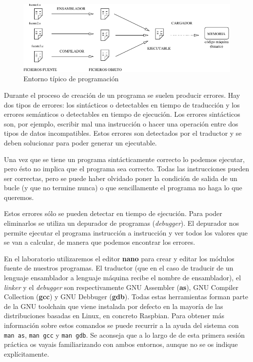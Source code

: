\begin{figure}[h]
  \centering
    \includegraphics[width=13cm]{graphs/ensamblado.pdf}
  \caption{Entorno típico de programación}
  \label{fig:entorno}
\end{figure}

Durante el proceso de creación de un programa se suelen producir errores.
Hay dos tipos de errores: los sintácticos o detectables en tiempo de
traducción y los errores semánticos o detectables en tiempo de ejecución.
Los errores sintácticos son, por ejemplo, escribir mal una instrucción o
hacer una operación entre dos tipos de datos incompatibles.
Estos errores son detectados por el traductor y se deben solucionar para
poder generar un ejecutable.

Una vez que se tiene un programa sintácticamente correcto lo podemos
ejecutar, pero ésto no implica que el programa sea correcto. Todas las
instrucciones pueden ser correctas, pero se puede haber olvidado poner la
condición de salida de un bucle (y que no termine nunca) o que
sencillamente el programa no haga lo que queremos.

Estos errores sólo se pueden detectar en tiempo de ejecución.
Para poder eliminarlos se utiliza un depurador de programas ({\it debugger}).
El depurador nos permite ejecutar el programa instrucción a instrucción y
ver todos los valores que se van a calcular, de manera que podemos encontrar
los errores.

En el laboratorio utilizaremos el editor {\bf nano} para crear
y editar los módulos fuente de nuestros programas. El traductor
(que en el caso de traducir de un lenguaje ensamblador a lenguaje máquina
recibe el nombre de ensamblador), el {\it linker} y el {\it debugger} son
respectivamente GNU Assembler ({\bf as}), GNU Compiler Collection ({\bf gcc})
y GNU Debbuger ({\bf gdb}). Todas estas herramientas forman parte de la
GNU toolchain que viene instalada por defecto en la mayoría de las distribuciones
basadas en Linux, en concreto Raspbian. Para obtener más información sobre estos
comandos se puede recurrir a la ayuda del sistema con {\tt man as}, {\tt man gcc} y
{\tt man gdb}. Se aconseja que a lo largo de de esta
primera sesión práctica os vayais familiarizando con ambos entornos,
aunque no se os indique explícitamente.

